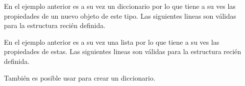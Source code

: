 \documentclass[a4paper,12pt,spanish]{sphinxmanual}
\begin{document}
\sphinxAtStartPar
En el ejemplo anterior  es a su vez un diccionario por lo que
tiene a su ves las propiedades de un nuevo objeto de este tipo.
Las siguientes lineas son válidas para la estructura recién definida.

\begin{sphinxVerbatim}[commandchars=\\\{\}]
\PYG{p}{[}\PYG{p}{]}\PYG{p}{[}\PYG{p}{]}

 \PYG{p}{[}\PYG{p}{]}\PYG{p}{[}\PYG{p}{]}
\end{sphinxVerbatim}

\sphinxAtStartPar
En el ejemplo anterior  es a
su vez una lista por lo que tiene a su ves las propiedades de estas.
Las siguientes lineas son válidas para la estructura recién definida.

\begin{sphinxVerbatim}[commandchars=\\\{\}]
   \PYG{p}{[}\PYG{p}{]}\PYG{p}{[}\PYG{p}{]}\PYG{p}{[}\PYG{p}{]}
\end{sphinxVerbatim}

\sphinxAtStartPar
También es posible usar  para crear un diccionario.
\end{document}

